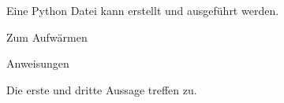 \begin{solution}
    Eine Python Datei kann erstellt und ausgeführt werden.
\end{solution}
\begin{task}[points=auto]{Zum Aufwärmen }
    \begin{subtask*}[points=0]{Anweisungen}
        \begin{itemize}
            \mchead
        \end{itemize}

        \begin{solution}
            Die erste und dritte Aussage treffen zu.
        \end{solution}
    \end{subtask*}
\end{task}

